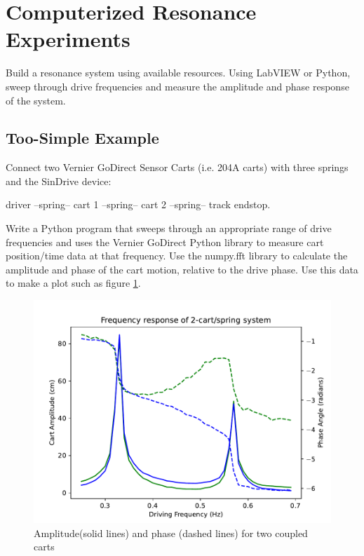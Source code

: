 \documentclass[11 pt]{article}
\begin{document}
\section*{Computerized Resonance Experiments}

Build a resonance system using available resources.
Using LabVIEW or Python, sweep through drive frequencies and measure the amplitude and phase response of the system.

\subsection*{Too-Simple Example}

Connect two Vernier GoDirect Sensor Carts (i.e. 204A carts) with three springs and the SinDrive device:

driver --spring-- cart 1 --spring-- cart 2 --spring-- track endstop.

Write a Python program that sweeps through an appropriate range of drive frequencies and uses the Vernier GoDirect Python library to measure cart position/time data at that frequency. 
Use the numpy.fft library to calculate the amplitude and phase of the cart motion, relative to the drive phase.
Use this data to make a plot such as figure \ref{fig:2-carts}.

\begin{figure}[h]
	\begin{center}
		\includegraphics{2-cart_response}
	\end{center}
	\caption{Amplitude(solid lines) and phase (dashed lines) for two coupled carts}
	\label{fig:2-carts}
\end{figure}
\end{document}
